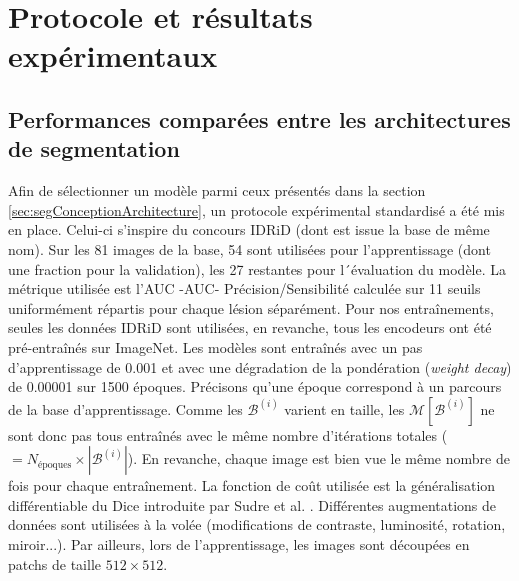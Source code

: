 \section{Protocole et résultats expérimentaux}


\subsection{Performances comparées entre les architectures de segmentation}
Afin de sélectionner un modèle parmi ceux présentés dans la section \ref{sec:segConceptionArchitecture}, un protocole expérimental standardisé a été mis en place. Celui-ci s'inspire du concours \ac{IDRiD} (dont est issue la base de même nom). Sur les 81 images de la base, 54 sont utilisées pour l'apprentissage (dont une fraction pour la validation), les 27 restantes pour l´évaluation du modèle. La métrique utilisée est l'\acl{AUC} -AUC- Précision/Sensibilité calculée sur 11 seuils uniformément répartis pour chaque lésion séparément. Pour nos entraînements, seules les données \ac{IDRiD} sont utilisées, en revanche, tous les encodeurs ont été pré-entraînés sur ImageNet. 
Les modèles sont entraînés avec un pas d'apprentissage de 0.001 et avec une dégradation de la pondération (\textit{weight decay}) de 0.00001 sur 1500 époques. Précisons qu'une époque correspond à un parcours de la base d'apprentissage. Comme les $\mathcal{B}^{(i)}$ varient en taille, les $\mathcal{M}[\mathcal{B}^{(i)}]$ ne sont donc pas tous entraînés avec le même nombre d'itérations totales ($= N_{\text{époques}} \times |\mathcal{B}^{(i)}|$). En revanche, chaque image est bien vue le même nombre de fois pour chaque entraînement. La fonction de coût utilisée est la généralisation différentiable du Dice introduite par Sudre et al. \cite{sudreGeneralisedDiceOverlap2017}. Différentes augmentations de données sont utilisées à la volée (modifications de contraste, luminosité, rotation, miroir...). Par ailleurs, lors de l'apprentissage, les images sont découpées en \og patchs \fg de taille $512 \times 512$.
